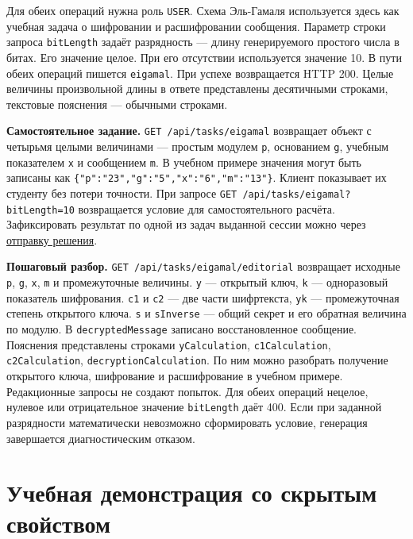 \documentclass[12pt,a4paper]{article}
\begin{document}
Для обеих операций нужна роль \texttt{USER}. Схема Эль-Гамаля используется здесь как учебная задача о шифровании и расшифровании сообщения. Параметр строки запроса \texttt{bitLength} задаёт разрядность --- длину генерируемого простого числа в битах. Его значение целое. При его отсутствии используется значение 10. В пути обеих операций пишется \texttt{eigamal}. При успехе возвращается HTTP 200. Целые величины произвольной длины в ответе представлены десятичными строками, текстовые пояснения --- обычными строками.

\textbf{Самостоятельное задание.} \texttt{GET /\allowbreak{}api/\allowbreak{}tasks/\allowbreak{}eigamal} возвращает объект с четырьмя целыми величинами --- простым модулем \texttt{p}, основанием \texttt{g}, учебным показателем \texttt{x} и сообщением \texttt{m}. В учебном примере значения могут быть записаны как \texttt{\{"p":"23","g":"5","x":"6","m":"13"\}}. Клиент показывает их студенту без потери точности. При запросе \texttt{GET /\allowbreak{}api/\allowbreak{}tasks/\allowbreak{}eigamal?\allowbreak{}bit\allowbreak{}Length=\allowbreak{}10} возвращается условие для самостоятельного расчёта. Зафиксировать результат по одной из задач выданной сессии можно через {\hyperlink{2-отправка-решения}{отправку решения}}.

\textbf{Пошаговый разбор.} \texttt{GET /\allowbreak{}api/\allowbreak{}tasks/\allowbreak{}eigamal/\allowbreak{}editorial} возвращает исходные \texttt{p}, \texttt{g}, \texttt{x}, \texttt{m} и промежуточные величины. \texttt{y} --- открытый ключ, \texttt{k} --- одноразовый показатель шифрования. \texttt{c1} и \texttt{c2} --- две части шифртекста, \texttt{yk} --- промежуточная степень открытого ключа. \texttt{s} и \texttt{sInverse} --- общий секрет и его обратная величина по модулю. В \texttt{decrypted\allowbreak{}Message} записано восстановленное сообщение. Пояснения представлены строками \texttt{y\allowbreak{}Calculation}, \texttt{c1Calculation}, \texttt{c2Calculation}, \texttt{decryption\allowbreak{}Calculation}. По ним можно разобрать получение открытого ключа, шифрование и расшифрование в учебном примере. Редакционные запросы не создают попыток. Для обеих операций нецелое, нулевое или отрицательное значение \texttt{bitLength} даёт 400. Если при заданной разрядности математически невозможно сформировать условие, генерация завершается диагностическим отказом.

\section{Учебная демонстрация со скрытым свойством}\label{ux443ux447ux435ux431ux43dux430ux44f-ux434ux435ux43cux43eux43dux441ux442ux440ux430ux446ux438ux44f-ux441ux43e-ux441ux43aux440ux44bux442ux44bux43c-ux441ux432ux43eux439ux441ux442ux432ux43eux43c}
\end{document}
